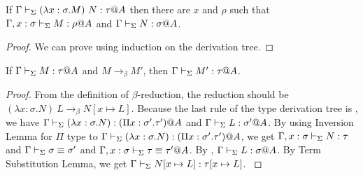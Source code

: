 \begin{lemma}
    \begin{item}
    \item If $\G \V (\lambda x:\sigma.M)\ N: \tau@A$ then there are $x$ and $\rho$ such that
        $\Gamma, x:\sigma \vdash_\Sigma M : \rho @A$ and $\Gamma \vdash_\Sigma N:\sigma @ A$.
    \end{item}
\end{lemma}

\begin{proof}
    We can prove using induction on the derivation tree.

\end{proof}

\begin{lemma}
    \label{lemma:PreservationOnBetaReduction}
    If $\G\V M:\tau@A$ and $M \longrightarrow_{\beta} M'$, then $\G\V M':\tau@A$.
\end{lemma}

\begin{proof}
    {
        \newcommand{\LB}{\longrightarrow_{\beta}}
        From the definition of \( \beta \)-reduction, the reduction should be
        $(\lambda x:\sigma.N)\ L \LB N[x\mapsto L]$.  Because the last rule of
        the type derivation tree is \TApp, we have $\Gamma \vdash_\Sigma (\lambda x:\sigma.N)
        : (\Pi x:\sigma'.\tau')@A$ and $\Gamma \vdash_\Sigma L:\sigma' @A$.  By using
        Inversion Lemma for $\Pi$ type to $\Gamma \vdash_\Sigma (\lambda x:\sigma.N) : (\Pi
        x:\sigma'.\tau')@A$, we get $\Gamma, x:\sigma \vdash_\Sigma N:\tau$ and $\Gamma \vdash_\Sigma \sigma
        \equiv \sigma'$ and $\Gamma ,x:\sigma \vdash_\Sigma \tau \equiv \tau'@A$.  By \TConv , $\Gamma \vdash_\Sigma
        L:\sigma @A$.  By Term Substitution Lemma, we get $\Gamma \vdash_\Sigma N[x\mapsto
        L]:\tau[x\mapsto L]$.
    }

\end{proof}


